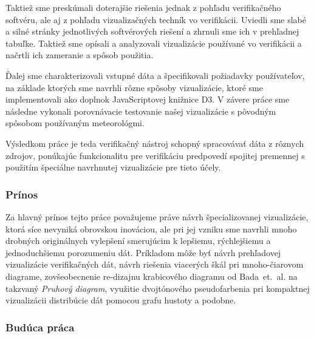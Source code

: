 Taktiež sme preskúmali doterajšie riešenia jednak z pohľadu verifikačného softvéru, ale aj z pohľadu vizualizačných techník vo verifikácii. Uviedli sme slabé a silné stránky jednotlivých softvérových riešení a zhrnuli sme ich v prehľadnej tabuľke. Taktiež sme opísali a analyzovali vizualizácie používané vo verifikácii a načrtli ich zameranie a spôsob použitia.

Ďalej sme charakterizovali vstupné dáta a špecifikovali požiadavky používateľov, na základe ktorých sme navrhli rôzne spôsoby vizualizácie, ktoré sme implementovali ako doplnok JavaScriptovej knižnice D3. V závere práce sme následne vykonali porovnávacie testovanie našej vizualizácie s pôvodným spôsobom používaným meteorológmi.

Výsledkom práce je teda verifikačný nástroj schopný spracovávať dáta z rôznych zdrojov, ponúkajúc funkcionalitu pre verifikáciu predpovedí spojitej premennej s použitím špeciálne navrhnutej vizualizácie pre tieto účely. 

\subsubsection{Prínos}

Za hlavný prínos tejto práce považujeme práve návrh špecializovanej vizualizácie, ktorá síce nevyniká obrovskou inováciou, ale pri jej vzniku sme navrhli mnoho drobných originálnych vylepšení smerujúcim k lepšiemu, rýchlejšiemu a jednoduchšiemu porozumeniu dát. Príkladom môže byť návrh prehľadovej vizualizácie verifikačných dát, návrh riešenia viacerých škál pri \mbox{mnoho-čiarovom} diagrame, zovšeobecnenie re-dizajnu krabicového diagramu od \mbox{Bada et. al.} \cite{Bade} na takzvaný \textit{Pruhový diagram}, využitie dvojtónového pseudofarbenia pri kompaktnej vizualizácii distribúcie dát pomocou grafu hustoty a podobne.

\subsubsection{Budúca práca}

